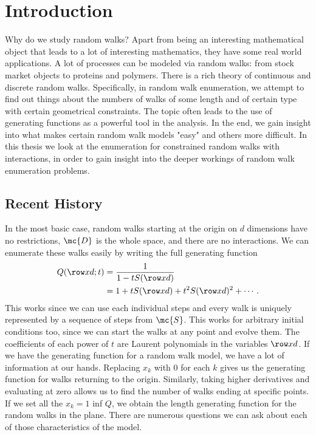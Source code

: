 
\chapter{Introduction}
\label{ch:Introduction}
	
Why do we study random walks? Apart from being an interesting mathematical object that leads to a lot of interesting mathematics, they have some real world applications. A lot of processes can be modeled via random walks: from stock market objects to proteins and polymers. There is a rich theory of continuous and discrete random walks. Specifically, in random walk enumeration, we attempt to find out things about the numbers of walks of some length and of certain type with certain geometrical constraints. The topic often leads to the use of generating functions as a powerful tool in the analysis. In the end, we gain insight into what makes certain random walk models "easy" and others more difficult. In this thesis we look at the enumeration for constrained random walks with interactions, in order to gain insight into the deeper workings of random walk enumeration problems.
\section{Recent History}

In the most basic case, random walks starting at the origin on $d$ dimensions have no restrictions, $\mc{D}$ is the whole space, and there are no interactions. We can enumerate these walks easily by writing the full generating function
\begin{align}
\begin{split}
	Q(\row xd;t) &= \frac{1}{1-tS(\row xd)} \\
			&= 1 + tS(\row xd) + t^2 S(\row xd)^2 + \cdots\,.
\end{split}
\end{align}
This works since we can use each individual steps and every walk is uniquely represented by a sequence of steps from $\mc{S}$. This works for arbitrary initial conditions too, since we can start the walks at any point and evolve them. The coefficients of each power of $t$ are Laurent polynomials in the variables $\row xd$. If we have the generating function for a random walk model, we have a lot of information at our hands. Replacing $x_k$ with $0$ for each $k$ gives us the generating function for walks returning to the origin. Similarly, taking higher derivatives and evaluating at zero allows us to find the number of walks ending at specific points. If we set all the $x_k = 1$ inf $Q$, we obtain the length generating function for the random walks in the plane. There are numerous questions we can ask about each of those characteristics of the model.


